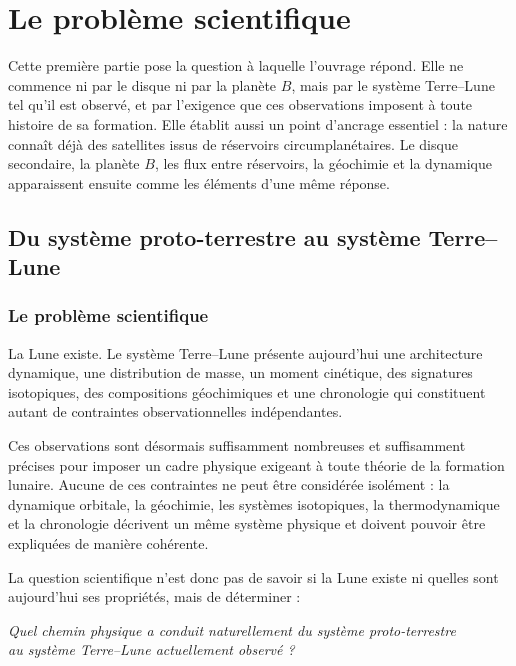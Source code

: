 \documentclass[11pt,a4paper,openany]{report}
\begin{document}
\part{Le problème scientifique}

\noindent
Cette première partie pose la question à laquelle l'ouvrage répond. Elle ne commence ni par le
disque ni par la planète $B$, mais par le système Terre--Lune tel qu'il est observé, et par
l'exigence que ces observations imposent à toute histoire de sa formation. Elle établit aussi un
point d'ancrage essentiel : la nature connaît déjà des satellites issus de réservoirs
circumplanétaires. Le disque secondaire, la planète $B$, les flux entre réservoirs, la géochimie
et la dynamique apparaissent ensuite comme les éléments d'une même réponse.

\chapter{Du système proto-terrestre au système Terre--Lune}
\label{ch:probleme}

\section{Le problème scientifique}

La Lune existe. Le système Terre--Lune présente aujourd'hui une architecture dynamique, une
distribution de masse, un moment cinétique, des signatures isotopiques, des compositions
géochimiques et une chronologie qui constituent autant de contraintes observationnelles
indépendantes.

Ces observations sont désormais suffisamment nombreuses et suffisamment précises pour
imposer un cadre physique exigeant à toute théorie de la formation lunaire. Aucune de ces
contraintes ne peut être considérée isolément : la dynamique orbitale, la géochimie, les
systèmes isotopiques, la thermodynamique et la chronologie décrivent un même système
physique et doivent pouvoir être expliquées de manière cohérente.

La question scientifique n'est donc pas de savoir si la Lune existe ni quelles sont aujourd'hui
ses propriétés, mais de déterminer :

\begin{center}
\emph{Quel chemin physique a conduit naturellement du système proto-terrestre\\ au système
Terre--Lune actuellement observé ?}
\end{center}
\end{document}
